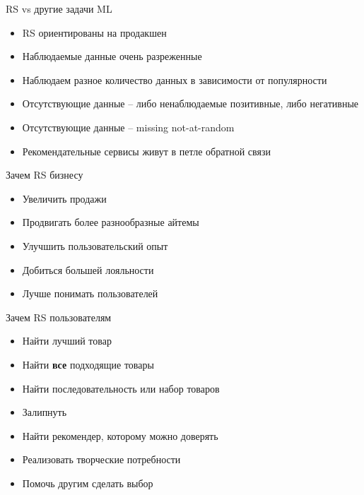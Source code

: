 \documentclass[11pt,aspectratio=169,handout]{beamer}
\begin{document}
\begin{frame}{RS vs другие задачи ML \cite{NETFLIX}}

\begin{itemize}[<+->]
\item RS ориентированы на продакшен
\item Наблюдаемые данные очень разреженные
\item Наблюдаем разное количество данных в зависимости от популярности
\item Отсутствующие данные -- либо ненаблюдаемые позитивные, либо негативные
\item Отсутствующие данные -- missing not-at-random
\item Рекомендательные сервисы живут в петле обратной связи
\end{itemize}

\end{frame}

\begin{frame}{Зачем RS бизнесу}

\begin{itemize}[<+->]
\item Увеличить продажи
\item Продвигать более разнообразные айтемы
\item Улучшить пользовательский опыт
\item Добиться большей лояльности
\item Лучше понимать пользователей
\end{itemize}

\end{frame}

\begin{frame}{Зачем RS пользователям}

\begin{itemize}[<+->]
\item Найти лучший товар
\item Найти {\bf все} подходящие товары
\item Найти последовательность или набор товаров
\item Залипнуть
\item Найти рекомендер, которому можно доверять
\item Реализовать творческие потребности
\item Помочь другим сделать выбор
\end{itemize}

\end{frame}
\end{document}
